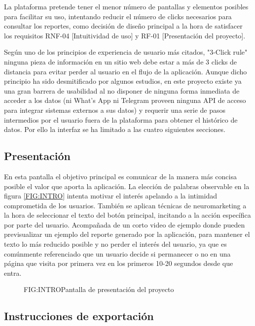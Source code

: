 
La plataforma pretende tener el menor número de pantallas y elementos posibles para facilitar su uso, intentando reducir el número de clicks necesarios para consultar los reportes, como decisión de diseño principal a la hora de satisfacer los requisitos RNF-04 [Intuitividad de uso] y RF-01 [Presentación del proyecto].

Según uno de los principios de experiencia de usuario más citados, "3-Click rule"\cite{3ClickRule} ninguna pieza de información en un sitio web debe estar a más de 3 clicks de distancia para evitar perder al usuario en el flujo de la aplicación. Aunque dicho principio ha sido desmitificado por algunos estudios\cite{3ClickRuleMyth}, en este proyecto existe ya una gran barrera de usabilidad al no disponer de ninguna forma inmediata de acceder a los datos (ni What's App ni Telegram proveen ninguna API de acceso para integrar sistemas externos a sus datos) y requerir una serie de pasos intermedios por el usuario fuera de la plataforma para obtener el histórico de datos. Por ello la interfaz se ha limitado a las cuatro siguientes secciones.

\subsection{Presentación}

En esta pantalla el objetivo principal es comunicar de la manera más concisa posible el valor que aporta la aplicación. La elección de palabras observable en la figura \ref{FIG:INTRO} intenta motivar el interés apelando a la intimidad comprometida de los usuarios. También se aplican técnicas de neuromarketing\cite{CallToAction} a la hora de seleccionar el texto del botón principal, incitando a la acción específica por parte del usuario. Acompañada de un corto video de ejemplo donde pueden previsualizar un ejemplo del reporte generado por la aplicación, para mantener el texto lo más reducido posible y no perder el interés del usuario, ya que es comúnmente referenciado que un usuario decide si permanecer o no en una página que visita por primera vez en los primeros 10-20 segundos desde que entra\cite{UserStay}.

\begin{figure}[]{FIG:INTRO}{Pantalla de presentación del proyecto}
\end{figure}

\subsection{Instrucciones de exportación}

